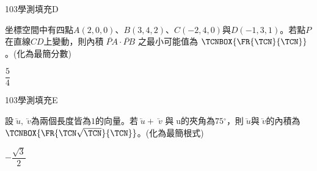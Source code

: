     \begin{QUESTION}
        \begin{ExamInfo}{103}{學測}{填充}{D}
        \end{ExamInfo}
        \begin{ExamAnsRateInfo}{31}{76}{16}{1}
        \end{ExamAnsRateInfo}
        \begin{QBODY}
            坐標空間中有四點$A(2,0,0)$、$B(3,4,2)$、$C(-2,4,0)$與$D(-1,3,1)$。若點$P$在直線$CD$上變動，則內積$\lvec{PA}\cdot \lvec{PB}$ 之最小可能值為 $\TCNBOX{\FR{\TCN}{\TCN}}$。(化為最簡分數)
        \end{QBODY}
        \begin{QFROMS}
        \end{QFROMS}
        \begin{QTAGS}\end{QTAGS}
        \begin{QANS}
            $\dfrac{5}{4}$
        \end{QANS}
        \begin{QSOLLIST}
        \end{QSOLLIST}
        \begin{QEMPTYSPACE}
        \end{QEMPTYSPACE}
    \end{QUESTION}
    \begin{QUESTION}
        \begin{ExamInfo}{103}{學測}{填充}{E}
        \end{ExamInfo}
        \begin{ExamAnsRateInfo}{31}{75}{17}{1}
        \end{ExamAnsRateInfo}
        \begin{QBODY}
            設$\lvec{u},\lvec{v}$為兩個長度皆為$1$的向量。若$\lvec{u} +\lvec{v}$ 與u的夾角為$75{}^\circ $，則$\lvec{u}$與$\lvec{v} $的內積為$\TCNBOX{\FR{\TCN\sqrt{\TCN}}{\TCN}}$。(化為最簡根式)
        \end{QBODY}
        \begin{QFROMS}
        \end{QFROMS}
        \begin{QTAGS}\end{QTAGS}
        \begin{QANS}
            $-\dfrac{\sqrt{3}}{2}$
        \end{QANS}
        \begin{QSOLLIST}
        \end{QSOLLIST}
        \begin{QEMPTYSPACE}
        \end{QEMPTYSPACE}
    \end{QUESTION}
